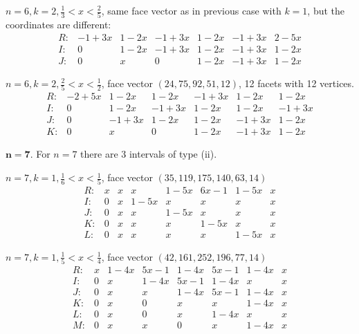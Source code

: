 \documentclass[a4paper,11pt,reqno]{amsart}
\theoremstyle{definition}
\numberwithin{equation}{section}
\begin{document}
$n=6, k=2,  \tfrac13 < x < \tfrac25$, %
 same face vector as in previous case with $k=1$, but the coordinates are different:
\[
\begin{array}{ccccccc}
R: &  -1 + 3 x &  1 - 2 x &  -1 + 3 x &  1 - 2 x &  -1 + 3 x & 2 - 5 x\\
I:  & 0 &  1 - 2 x &  -1 + 3 x &  1 - 2 x & -1 + 3 x &  1 - 2 x  \\
J:  &  0 &  x &  0 & 1 - 2 x & -1 + 3 x &  1 - 2 x
\end{array}
\]

$n=6, k=2,  \tfrac25 < x < \tfrac12$, face vector  $(24, 75,  92, 51, 12)$, %
12 facets with 12 vertices.
\[
\begin{array}{ccccccc}
R:  &  -2 + 5 x &  1 - 2 x &  1 - 2 x & -1 + 3 x &  1 - 2 x &  1 - 2 x \\
I: & 0  &  1 - 2 x   &  -1 + 3 x &  1 - 2 x &  1 - 2 x &  -1 + 3 x \\
J: & 0 &  -1 + 3 x &  1 - 2 x &  1 - 2 x &  -1 + 3 x &  1 - 2 x \\
K: &   0 & x & 0 &  1 - 2 x & -1 + 3 x &  1 - 2 x
\end{array}
\]

\goodbreak
\noindent $\mathbf{n=7}$.
For $n=7$ there are 3 intervals of type (ii).

$n=7, k=1, \tfrac16 < x < \tfrac15 $,  face vector $(35,119,175,140,63,14)$
\[
\begin{array}{cccccccc}
R: &  x & x & x & 1-5 x & 6 x-1 & 1-5 x & x \\
I:& 0 & x & 1-5 x & x & x & x & x \\
J:& 0 & x & x & 1-5 x & x & x & x \\
K:& 0 & x & x & x & 1-5 x & x & x \\
L:& 0 & x & x & x & x & 1-5 x & x
\end{array}
\]

$n=7, k=1, \tfrac15 < x < \tfrac14 $, face vector $(42, 161, 252, 196, 77, 14)$
\[
\begin{array}{cccccccc}
R:& x & 1-4 x & 5 x-1 & 1-4 x & 5 x-1 & 1-4 x & x \\
I:& 0 & x & 1-4 x & 5 x-1 & 1-4 x & x & x \\
J:& 0 & x & x & 1-4 x & 5 x-1 & 1-4 x & x \\
K:& 0 & x & 0 & x & x & 1-4 x & x \\
L:& 0 & x & 0 & x & 1-4 x & x & x \\
M:& 0 & x & x & 0 & x & 1-4 x & x
\end{array}
\]
\end{document}
